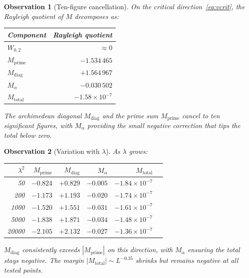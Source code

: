 \documentclass[11pt,a4paper]{article}
\newtheorem{observation}{Observation}[section]
\begin{document}
\begin{observation}[Ten-figure cancellation]\label{obs:cancellation}
On the critical direction~\eqref{eq:vcrit}, the Rayleigh quotient of $M$ decomposes as:
\begin{center}
\begin{tabular}{lr}
\toprule
Component & Rayleigh quotient \\
\midrule
$W_{0,2}$ & $\approx 0$ \\
$M_{\mathrm{prime}}$ & $-1.534\,465$ \\
$M_{\mathrm{diag}}$ & $+1.564\,967$ \\
$M_{\alpha}$ & $-0.030\,502$ \\
\midrule
$M_{\mathrm{total}}$ & $-1.58 \times 10^{-7}$ \\
\bottomrule
\end{tabular}
\end{center}

The archimedean diagonal $M_{\mathrm{diag}}$ and the prime sum $M_{\mathrm{prime}}$ cancel to ten significant figures, with $M_{\alpha}$ providing the small negative correction that tips the total below zero.
\end{observation}

\begin{observation}[Variation with $\lambda$]\label{obs:variation}
As $\lambda$ grows:
\begin{center}
\begin{tabular}{rrrrrl}
\toprule
$\lambda^2$ & $M_{\mathrm{prime}}$ & $M_{\mathrm{diag}}$ & $M_{\alpha}$ & $M_{\mathrm{total}}$ \\
\midrule
50 & $-0.824$ & $+0.829$ & $-0.005$ & $-1.84 \times 10^{-7}$ \\
200 & $-1.173$ & $+1.193$ & $-0.020$ & $-1.74 \times 10^{-7}$ \\
1000 & $-1.520$ & $+1.551$ & $-0.031$ & $-1.61 \times 10^{-7}$ \\
5000 & $-1.838$ & $+1.871$ & $-0.034$ & $-1.48 \times 10^{-7}$ \\
20000 & $-2.105$ & $+2.132$ & $-0.027$ & $-1.36 \times 10^{-7}$ \\
\bottomrule
\end{tabular}
\end{center}

$M_{\mathrm{diag}}$ consistently exceeds $|M_{\mathrm{prime}}|$ on this direction, with $M_{\alpha}$ ensuring the total stays negative. The margin $|M_{\mathrm{total}}| \sim L^{-0.35}$ shrinks but remains negative at all tested points.
\end{observation}
\end{document}
